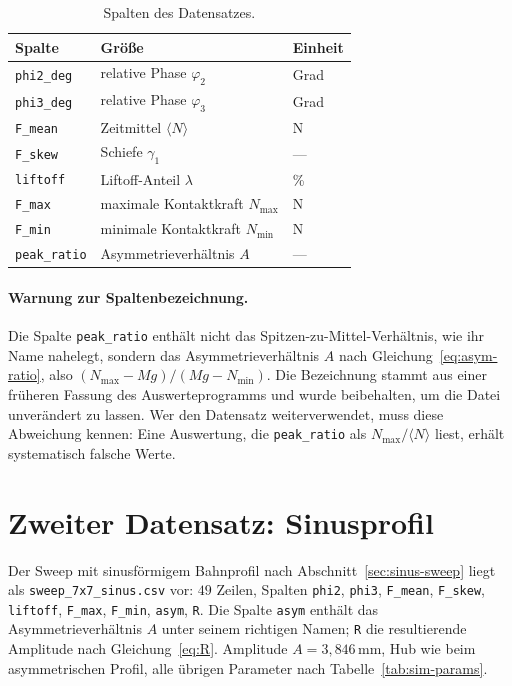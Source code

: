 \documentclass[12pt,a4paper]{report}
\begin{document}
\begin{table}[htbp]
  \centering
  \begin{tabular}{lll}
    \hline
    Spalte & Größe & Einheit \\
    \hline
    \texttt{phi2\_deg}   & relative Phase $\varphi_2$ & Grad \\
    \texttt{phi3\_deg}   & relative Phase $\varphi_3$ & Grad \\
    \texttt{F\_mean}     & Zeitmittel $\langle N \rangle$ & N \\
    \texttt{F\_skew}     & Schiefe $\gamma_1$ & --- \\
    \texttt{liftoff}     & Liftoff-Anteil $\lambda$ & \% \\
    \texttt{F\_max}      & maximale Kontaktkraft $N_{\max}$ & N \\
    \texttt{F\_min}      & minimale Kontaktkraft $N_{\min}$ & N \\
    \texttt{peak\_ratio} & Asymmetrieverhältnis $A$ & --- \\
    \hline
  \end{tabular}
  \caption{Spalten des Datensatzes.}
  \label{tab:csv-spalten}
\end{table}

\paragraph{Warnung zur Spaltenbezeichnung.}
Die Spalte \texttt{peak\_ratio} enthält nicht das
Spitzen-zu-Mittel-Verhältnis, wie ihr Name nahelegt, sondern das
Asymmetrieverhältnis $A$ nach Gleichung~\eqref{eq:asym-ratio}, also
$(N_{\max}-Mg)/(Mg-N_{\min})$. Die Bezeichnung stammt aus einer früheren
Fassung des Auswerteprogramms und wurde beibehalten, um die Datei
unverändert zu lassen. Wer den Datensatz weiterverwendet, muss diese
Abweichung kennen: Eine Auswertung, die \texttt{peak\_ratio} als
$N_{\max}/\langle N \rangle$ liest, erhält systematisch falsche Werte.

\section{Zweiter Datensatz: Sinusprofil}

Der Sweep mit sinusförmigem Bahnprofil nach
Abschnitt~\ref{sec:sinus-sweep} liegt als
\texttt{sweep\_\allowbreak 7x7\_\allowbreak sinus.csv} vor: $49$ Zeilen, Spalten
\texttt{phi2}, \texttt{phi3}, \texttt{F\_mean}, \texttt{F\_skew},
\texttt{liftoff}, \texttt{F\_max}, \texttt{F\_min}, \texttt{asym},
\texttt{R}. Die Spalte \texttt{asym} enthält das Asymmetrieverhältnis
$A$ unter seinem richtigen Namen; \texttt{R} die resultierende Amplitude
nach Gleichung~\eqref{eq:R}. Amplitude $A = 3{,}846\,\mathrm{mm}$,
Hub wie beim asymmetrischen Profil, alle übrigen Parameter nach
Tabelle~\ref{tab:sim-params}.
\end{document}
